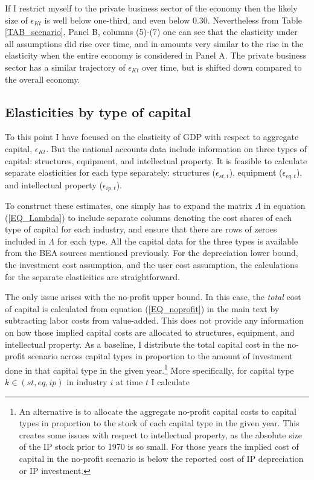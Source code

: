 \documentclass[11pt]{article}
\begin{document}
If I restrict myself to the private business sector of the economy then the likely size of $\epsilon_{Kt}$ is well below one-third, and even below 0.30. Nevertheless from Table \ref{TAB_scenario}, Panel B, columns (5)-(7) one can see that the elasticity under all assumptions did rise over time, and in amounts very similar to the rise in the elasticity when the entire economy is considered in Panel A. The private business sector has a similar trajectory of $\epsilon_{Kt}$ over time, but is shifted down compared to the overall economy.

\subsection{Elasticities by type of capital}
To this point I have focused on the elasticity of GDP with respect to aggregate capital, $\epsilon_{Kt}$. But the national accounts data include information on three types of capital: structures, equipment, and intellectual property. It is feasible to calculate separate elasticities for each type separately: structures ($\epsilon_{st,t}$), equipment ($\epsilon_{eq,t}$), and intellectual property ($\epsilon_{ip,t}$).

To construct these estimates, one simply has to expand the matrix $\Lambda$ in equation (\ref{EQ_Lambda}) to include separate columns denoting the cost shares of each type of capital for each industry, and ensure that there are rows of zeroes included in $\Lambda$ for each type. All the capital data for the three types is available from the BEA sources mentioned previously. For the depreciation lower bound, the investment cost assumption, and the user cost assumption, the calculations for the separate elasticities are straightforward. 

The only issue arises with the no-profit upper bound. In this case, the \textit{total} cost of capital is calculated from equation (\ref{EQ_noprofit}) in the main text by subtracting labor costs from value-added. This does not provide any information on how those implied capital costs are allocated to structures, equipment, and intellectual property. As a baseline, I distribute the total capital cost in the no-profit scenario across capital types in proportion to the amount of investment done in that capital type in the given year.\footnote{An alternative is to allocate the aggregate no-profit capital costs to capital types in proportion to the stock of each capital type in the given year. This creates some issues with respect to intellectual property, as the absolute size of the IP stock prior to 1970 is so small. For those years the implied cost of capital in the no-profit scenario is below the reported cost of IP depreciation or IP investment.} More specifically, for capital type $k \in (st,eq,ip)$ in industry $i$ at time $t$ I calculate
\end{document}

